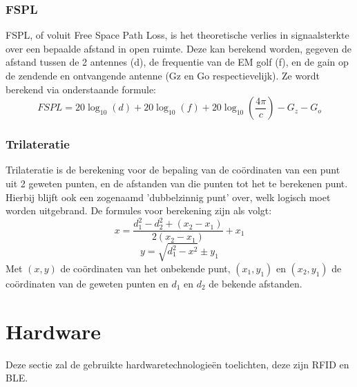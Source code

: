 \subsubsection{FSPL}
FSPL, of voluit Free Space Path Loss, is het theoretische verlies in signaalsterkte over een bepaalde afstand in open ruimte. Deze kan berekend worden, gegeven de afstand tussen de 2 antennes (d), de frequentie van de EM golf (f), en de gain op de zendende en ontvangende antenne (Gz en Go respectievelijk). Ze wordt berekend via onderstaande formule: 
\[FSPL = 20\log_{10}(d) + 20\log_{10}(f) + 20\log_{10}(\frac{4\pi}{c}) - G_z - G_o \]
\autocite{Pasternack2020}

\subsubsection{Trilateratie}
Trilateratie is de berekening voor de bepaling van de coördinaten van een punt uit 2 geweten punten, en de afstanden van die punten tot het te berekenen punt. Hierbij blijft ook een zogenaamd 'dubbelzinnig punt' over, welk logisch moet worden uitgebrand. De formules voor berekening zijn als volgt:
 \[x = \frac{d_1^2 - d_2^2 + (x_2 - x_1)}{2(x_2 - x_1)} + x_1\]
 \[y = \sqrt{d_1^2 - x^2} \pm y_1\]
 Met \((x,  y)\) de coördinaten van het onbekende punt,  \((x_1, y_1)\) en \((x_2, y_1)\) de coördinaten van de geweten punten en \(d_1\) en \(d_2\) de bekende afstanden.
 \autocite{TRM2022}

\section{Hardware}
\label{sec:lit-hardware}
Deze sectie zal de gebruikte hardwaretechnologieën toelichten, deze zijn RFID en BLE.


